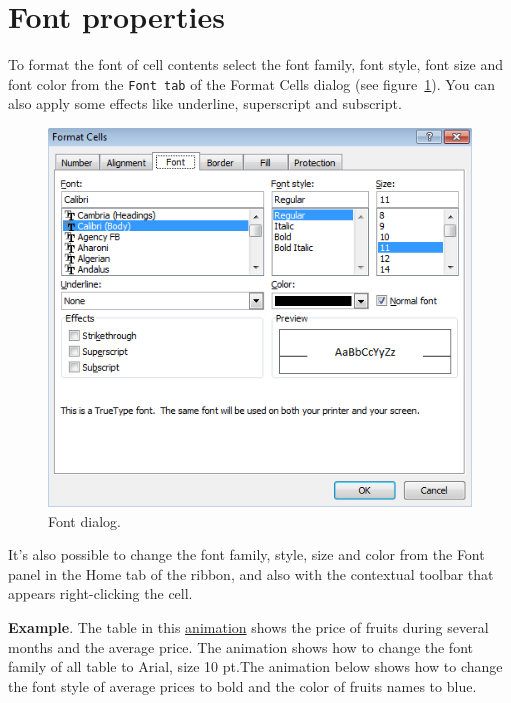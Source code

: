 \section{Font properties}\hypertarget{font-properties}{}\label{font-properties}

To format the font of cell contents select the font family, font style, font size and font color from the \texttt{Font
tab} of the Format Cells dialog (see figure~\ref{img-font_dialog}). You can also apply some effects like underline, superscript
and subscript.

\begin{figure}[htbp]
\begin{center}
\includegraphics[scale=0.7]{../img/font_dialog.png}
\end{center}
\caption{Font dialog.}
\label{img-font_dialog}
\end{figure}

It's also possible to change the font family, style, size and color from the Font panel in the Home tab of the ribbon, and also with the contextual toolbar that appears right-clicking the cell.

\textbf{Example}. The table in this \href{http://aprendeconalf.es/office/excel/manual/img/example_font_family.gif}{animation} shows the price of fruits during several months and the average price. The animation shows how to change the font family of all table to Arial, size 10 pt.The animation below shows how to change the font style of average prices to bold and the color of fruits names to blue.


